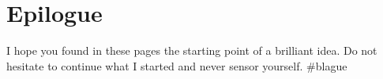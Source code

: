 \section*{Epilogue}
\label{s:Epilogue}

I hope you found in these pages the starting point of a brilliant idea. Do not hesitate to continue what I started and never sensor yourself. \#blague